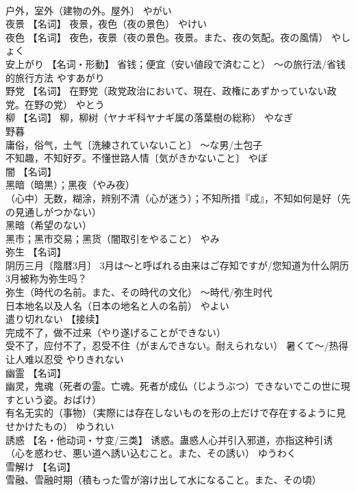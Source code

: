 \documentclass[8pt]{extreport}
\begin{document}
\begin{CJK}{UTF8}{min}
\\	户外，室外（建物の外。屋外〕	やがい	
\\	夜景	【名词】 夜景，夜色（夜の景色）	やけい	
\\	夜色	【名词】 夜色，夜景（夜の景色。夜景。また、夜の気配。夜の風情）	やしょく	
\\	安上がり	【名词・形動】 省钱；便宜（安い値段で済むこと） ～の旅行法/省钱的旅行方法	やすあがり	
\\	野党	【名词】 在野党（政党政治において、現在、政権にあずかっていない政党。在野の党）	やとう	
\\	柳	【名词】 柳，柳树（ヤナギ科ヤナギ属の落葉樹の総称）	やなぎ	
\\	野暮	
\\	庸俗，俗气，土气〔洗練されていないこと〕 ～な男/土包子 
\\	不知趣，不知好歹。不懂世路人情〔気がきかないこと〕	やぼ	
\\	闇	【名词】 
\\	黑暗（暗黒）；黑夜（やみ夜） 
\\	（心中）无数，糊涂，辨别不清（心が迷う）；不知所措『成』，不知如何是好（先の見通しがつかない） 
\\	黑暗（希望のない） 
\\	黑市；黑市交易；黑货（闇取引をやること）	やみ	
\\	弥生	【名词】 
\\	阴历三月〔陰暦3月〕 3月は～と呼ばれる由来はご存知ですが/您知道为什么阴历3月被称为弥生吗？ 
\\	弥生（時代の名前。また、その時代の文化） ～時代/弥生时代 
\\	日本地名以及人名（日本の地名と人の名前）	やよい	
\\	遣り切れない	【接续】 
\\	完成不了，做不过来（やり遂げることができない） 
\\	受不了，应付不了，忍受不住（がまんできない。耐えられない） 暑くて～/热得让人难以忍受	やりきれない	
\\	幽霊	【名词】 
\\	幽灵，鬼魂（死者の霊。亡魂。死者が成仏（じようぶつ）できないでこの世に現すという姿。おばけ） 
\\	有名无实的（事物）（実際には存在しないものを形の上だけで存在するように見せかけたもの）	ゆうれい	
\\	誘惑	【名・他动词・サ变/三类】 诱惑。蛊惑人心并引入邪道，亦指这种引诱（心を惑わせ、悪い道へ誘い込むこと。また、その誘い）	ゆうわく	
\\	雪解け	【名词】 
\\	雪融、雪融时期（積もった雪が溶け出して水になること。また、その頃） 

\end{CJK}
\end{document}
